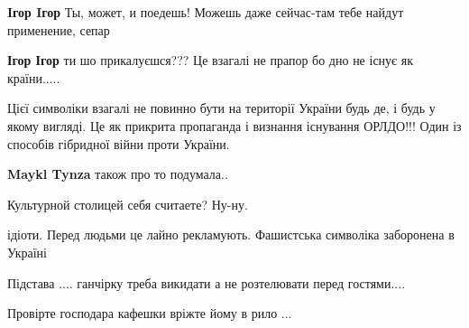 \begin{itemize}
\begin{itemize}
\textbf{Iгор Iгор} Ты, может, и поедешь! Можешь даже сейчас-там тебе найдут применение, сепар💩

 
\textbf{Ігор Ігор} ти шо прикалуєшся??? Це взагалі не прапор бо дно не існує як країни.....

\end{itemize}

 

Цієї символіки взагалі не повинно бути на території України будь де, і будь у
якому вигляді. Це як прикрита пропаганда і визнання існування ОРЛДО!!! Один із
способів гібридної війни проти України.



\begin{itemize}
 
\textbf{Maykl Tynza} також про то подумала..
\end{itemize}

 
Культурной столицей себя считаете? Ну-ну.

 
ідіоти. Перед людьми це лайно рекламують. Фашистська символіка заборонена в Україні

 

Підстава .... ганчірку треба викидати а не розтелювати перед гостями....

Провірте господара кафешки вріжте йому в рило ...

\end{itemize}

